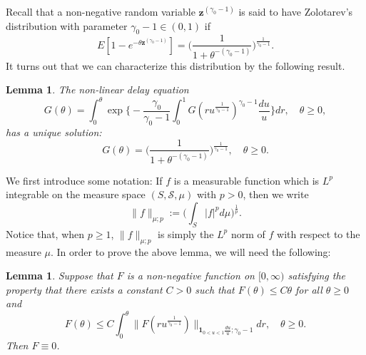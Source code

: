 \documentclass[12pt, a4paper]{amsart}
\newtheorem{lem}[thm]{Lemma}
\theoremstyle{definition}
\numberwithin{equation}{section}
\begin{document}
	Recall that a non-negative random variable $\mathbf z^{(\gamma_0 - 1)}$ is said to have Zolotarev's distribution with parameter $\gamma_0 - 1 \in (0,1)$ if
\begin{equation}
	E[1-e^{-\theta\mathbf z^{(\gamma_0 - 1)}}]
	=\Big( \frac{1}{1+\theta^{-(\gamma_0 - 1)}} \Big)^{\frac{1}{\gamma_0 - 1}}.
\end{equation}
	It turns out that we can characterize this distribution by the following result.

\begin{lem} \label{lem: characterize the general Mittag-Leffler distribution}
	The non-linear delay equation
\begin{equation} \label{eq: equation for the distribution}
	G( \theta)
	= \int_0^\theta \exp\Big\{ - \frac{\gamma_0} {\gamma_0 - 1} \int_0^1 G(ru^{\frac{1}{\gamma_0 - 1} })^{\gamma_0 - 1}\frac{du}{u} \Big\} dr,
	\quad \theta \geq 0,
\end{equation}
	has a unique solution:
\begin{equation}\label{eq: solution for the equation}
	G(\theta)
	= \Big(\frac{1}{1+\theta^{-(\gamma_0 - 1)}}\Big)^{\frac{1}{\gamma_0 - 1}},
	\quad \theta \geq 0.
\end{equation}
\end{lem}

	We first introduce some notation:
	If $f$ is a measurable function which is $L^p$ integrable on the measure space $(S,\mathscr S,\mu)$ with $p > 0$, then we write
\begin{equation}
	\|f\|_{\mu;p} 
	:= \Big(\int_{S} |f|^p d\mu \Big)^{\frac{1}{p}}.
\end{equation}
	Notice that, when $p\geq 1$, $\|f\|_{\mu;p}$ is simply the $L^p$ norm of $f$ with respect to the measure $\mu$.	
	In order to prove the above lemma, we will need the following:

\begin{lem}\label{lem: F is zero}
	Suppose that $F$ is a non-negative function on $[0,\infty)$ satisfying the property that there exists a constant $C>0$ such that  $F(\theta) \leq C\theta$ for all $\theta \geq 0$ and
\begin{equation}
	F(\theta)
	\leq C \int_0^\theta \|  F(ru^{ \frac{1}{\gamma_0- 1}  })\|_{\mathbf 1_{0<u<1}\frac{du}{u}; \gamma_0 - 1} dr, \quad \theta \geq 0.
\end{equation}
	Then $F \equiv 0$.
\end{lem}
	
\end{document}
